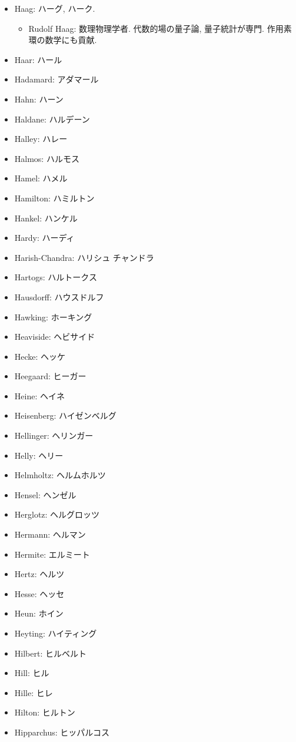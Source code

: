 \documentclass[openany, a4paper, oneside]{jsbook}
\begin{document}
\begin{itemize}
\item Haag: ハーグ, ハーク.
\begin{itemize}
\item Rudolf Haag: 数理物理学者. 代数的場の量子論, 量子統計が専門. 作用素環の数学にも貢献.
\end{itemize}
\item Haar: ハール
\item Hadamard: アダマール
\item Hahn: ハーン
\item Haldane: ハルデーン
\item Halley: ハレー
\item Halmos: ハルモス
\item Hamel: ハメル
\item Hamilton: ハミルトン
\item Hankel: ハンケル
\item Hardy: ハーディ
\item Harish-Chandra: ハリシュ チャンドラ
\item Hartogs: ハルトークス
\item Hausdorff: ハウスドルフ
\item Hawking: ホーキング
\item Heaviside: ヘビサイド
\item Hecke: ヘッケ
\item Heegaard: ヒーガー
\item Heine: ヘイネ
\item Heisenberg: ハイゼンベルグ
\item Hellinger: ヘリンガー
\item Helly: ヘリー
\item Helmholtz: ヘルムホルツ
\item Hensel: ヘンゼル
\item Herglotz: ヘルグロッツ
\item Hermann: ヘルマン
\item Hermite: エルミート
\item Hertz: ヘルツ
\item Hesse: ヘッセ
\item Heun: ホイン
\item Heyting: ハイティング
\item Hilbert: ヒルベルト
\item Hill: ヒル
\item Hille: ヒレ
\item Hilton: ヒルトン
\item Hipparchus: ヒッパルコス

\end{itemize}
\end{document}
